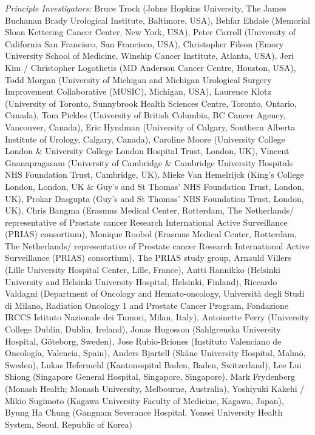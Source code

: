 \textit{Principle Investigators:} Bruce Trock (Johns Hopkins University, The James Buchanan Brady Urological Institute, Baltimore, USA), Behfar Ehdaie (Memorial Sloan Kettering Cancer Center, New York, USA), Peter Carroll (University of California San Francisco, San Francisco, USA), Christopher Filson (Emory University School of Medicine, Winship Cancer Institute,  Atlanta, USA), Jeri Kim / Christopher Logothetis (MD Anderson Cancer Centre, Houston, USA), Todd Morgan (University of Michigan and Michigan Urological Surgery Improvement Collaborative (MUSIC), Michigan, USA), Laurence Klotz (University of Toronto, Sunnybrook Health Sciences Centre, Toronto, Ontario, Canada),  Tom Pickles (University of British Columbia, BC Cancer Agency, Vancouver, Canada), Eric Hyndman (University of Calgary, Southern Alberta Institute of Urology, Calgary, Canada), Caroline Moore (University College London \& University College London Hospital Trust, London, UK), Vincent Gnanapragasam (University of Cambridge \& Cambridge University Hospitals NHS Foundation Trust, Cambridge, UK), Mieke Van Hemelrijck (King's College London, London, UK \& Guy’s and St Thomas’ NHS Foundation Trust, London, UK), Prokar Dasgupta (Guy’s and St Thomas’ NHS Foundation Trust, London, UK), Chris Bangma (Erasmus Medical Center, Rotterdam, The Netherlands/ representative of Prostate cancer Research International Active Surveillance (PRIAS) consortium), Monique Roobol (Erasmus Medical Center, Rotterdam, The Netherlands/ representative of Prostate cancer Research International Active Surveillance (PRIAS) consortium), The PRIAS study group, Arnauld Villers (Lille University Hospital Center, Lille, France), Antti Rannikko (Helsinki University and Helsinki University Hospital, Helsinki, Finland), Riccardo Valdagni (Department of Oncology and Hemato-oncology, Università degli Studi di Milano, Radiation Oncology 1 and Prostate Cancer Program, Fondazione IRCCS Istituto Nazionale dei Tumori, Milan, Italy), Antoinette Perry (University College Dublin, Dublin, Ireland), Jonas Hugosson (Sahlgrenska University Hospital, Göteborg, Sweden), Jose Rubio-Briones (Instituto Valenciano de Oncología, Valencia, Spain), Anders Bjartell (Skåne University Hospital, Malmö, Sweden), Lukas Hefermehl (Kantonsspital Baden, Baden, Switzerland), Lee Lui Shiong (Singapore General Hospital, Singapore, Singapore), Mark Frydenberg (Monash Health; Monash University,  Melbourne, Australia), Yoshiyuki Kakehi / Mikio Sugimoto (Kagawa University Faculty of Medicine, Kagawa, Japan), Byung Ha Chung (Gangnam Severance Hospital, Yonsei University Health System, Seoul, Republic of Korea)

